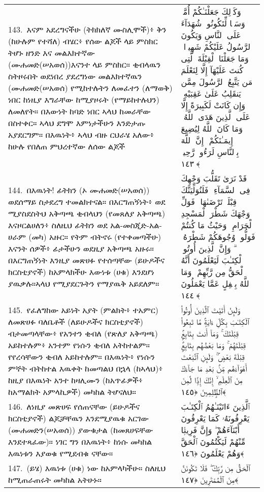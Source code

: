 \documentclass[11pt,a4paper,oneside]{article}%
\newcommand{\mytextarabic}[1]{\textarabic{ #1 \flushright}}
\begin{document}
\begin{longtable}{%
  @{}
    p{}
  @{~~~}
    p{}
    @{}
}
143.\ እናም አደረግናችሁ (ትክክለኛ ሙስሊሞች)፥ ቅን (ከሁሉም የተሻለ) ብሄር፥ የሰው ልጆች ላይ ምስክር ትሆኑ ዘንድ እና መልእክተኛው (ሙሐመድ(ሠአወሰ))እናንተ ላይ ምስክር። ቂብላዉን ስትዞሩበት ወደነበረ ያደረግነው መልእክተኛዉን (ሙሐመድ(ሠአወሰ) የሚከተሉትን ለመፈተን (ለማወቅ) ነበር ከነዚያ እግራቸው ከሚያዞሩት (የማይከተሉህን) ለመለየት። በእውነት ከባድ ነበር ኣላህ ከመራቸው በስተቀር። ኣላህ ደግሞ እምነታችሁን እንድታጡ አያደርግም። በእዉነት፥ ኣላህ ብዙ ርህራሄ አለው፥ ከሁሉ የበለጠ ምህረተኛው ለሰው ልጆች &  \mytextarabic{وَكَذَٟلِكَ جَعَلْنَـٰكُمْ أُمَّةًۭ وَسَطًۭا لِّتَكُونُوا۟ شُهَدَآءَ عَلَى ٱلنَّاسِ وَيَكُونَ ٱلرَّسُولُ عَلَيْكُمْ شَهِيدًۭا ۗ وَمَا جَعَلْنَا ٱلْقِبْلَةَ ٱلَّتِى كُنتَ عَلَيْهَآ إِلَّا لِنَعْلَمَ مَن يَتَّبِعُ ٱلرَّسُولَ مِمَّن يَنقَلِبُ عَلَىٰ عَقِبَيْهِ ۚ وَإِن كَانَتْ لَكَبِيرَةً إِلَّا عَلَى ٱلَّذِينَ هَدَى ٱللَّهُ ۗ وَمَا كَانَ ٱللَّهُ لِيُضِيعَ إِيمَـٰنَكُمْ ۚ إِنَّ ٱللَّهَ بِٱلنَّاسِ لَرَءُوفٌۭ رَّحِيمٌۭ ﴿١٤٣﴾}\\
144.\ በእዉነት! ፊትክን (ኦ ሙሐመድ(ሠአወሰ)) ወደሰማይ ስታደረግ ተመልክተናል። በእርግጠኝነት፥ ወደ ሚያስደስትህ አቅጣጫ ቂብላህን (የመጸለያ አቅጣጫ) እናዞርልሀለን፥ ስለዚህ ፊትክን ወደ አል-መስጂድ-አል-ሀራም (መካ) አዙር። የትም ብትኖሩ (የተቀመጣችሁ) እናንት ሰዎች፥ ፊታችሁን ወደዚያ አቅጣጫ አዙሩ። በእርግጠኝነት እንዚያ መጽሀፉ የተሰጣቸው (ይሁዶችና ክርስቲያኖች) ከአምላክችሁ እውነቱ (ሀቁ) እንደሆነ ያዉቃሉ።ኣላህ የሚያደርጉትን የማያዉቅ አይደለም።  &  \mytextarabic{قَدْ نَرَىٰ تَقَلُّبَ وَجْهِكَ فِى ٱلسَّمَآءِ ۖ فَلَنُوَلِّيَنَّكَ قِبْلَةًۭ تَرْضَىٰهَا ۚ فَوَلِّ وَجْهَكَ شَطْرَ ٱلْمَسْجِدِ ٱلْحَرَامِ ۚ وَحَيْثُ مَا كُنتُمْ فَوَلُّوا۟ وُجُوهَكُمْ شَطْرَهُۥ ۗ وَإِنَّ ٱلَّذِينَ أُوتُوا۟ ٱلْكِتَـٰبَ لَيَعْلَمُونَ أَنَّهُ ٱلْحَقُّ مِن رَّبِّهِمْ ۗ وَمَا ٱللَّهُ بِغَٟفِلٍ عَمَّا يَعْمَلُونَ ﴿١٤٤﴾}\\
145.\ የፈለግከው አይነት አያት (ምልክት፥ ተአምር) ለመጽሀፉ ባለቤቶች (ለይሁዶችና ክርስቲያኖች) ብታመጣላቸው፥ የአንተን ቂብለ (የጽለያ አቅጣጫ) አይከተሉም፥ አንተም የነሱን ቂብለ አትከተልም። የየረሳቸውን ቂብለ አይከተሉም። በእዉነት፥ የነሱን ምኞት ብትከተል እዉቀት ከመጣልህ በኋላ (ከኣላህ)፥ ከዚያ በእዉነት አንተ ከዛሊሙን (ከአጥፊዎች፥ ከአማልክት አምላኪዎች) መካከል ትሆናለህ። &  \mytextarabic{وَلَىِٕنْ أَتَيْتَ ٱلَّذِينَ أُوتُوا۟ ٱلْكِتَـٰبَ بِكُلِّ ءَايَةٍۢ مَّا تَبِعُوا۟ قِبْلَتَكَ ۚ وَمَآ أَنتَ بِتَابِعٍۢ قِبْلَتَهُمْ ۚ وَمَا بَعْضُهُم بِتَابِعٍۢ قِبْلَةَ بَعْضٍۢ ۚ وَلَىِٕنِ ٱتَّبَعْتَ أَهْوَآءَهُم مِّنۢ بَعْدِ مَا جَآءَكَ مِنَ ٱلْعِلْمِ ۙ إِنَّكَ إِذًۭا لَّمِنَ ٱلظَّٟلِمِينَ ﴿١٤٥﴾}\\
146.\ ለነዚያ መጽሀፍ የሰጠናቸው (ይሁዶችና ክርስቲያኖች) ልጆቻቸዉን እንደሚያዉቁ አርገው (ሙሐመድን(ሠአወሰ)) ያውቁታል (ከመጸሀፍቸው እንደተጻፈው)። ነገር ግን በእዉነት፥ ከነሱ መካከል እዉነቱን እያወቁ የሚደብቁ ናቸው። &  \mytextarabic{ٱلَّذِينَ ءَاتَيْنَـٰهُمُ ٱلْكِتَـٰبَ يَعْرِفُونَهُۥ كَمَا يَعْرِفُونَ أَبْنَآءَهُمْ ۖ وَإِنَّ فَرِيقًۭا مِّنْهُمْ لَيَكْتُمُونَ ٱلْحَقَّ وَهُمْ يَعْلَمُونَ ﴿١٤٦﴾}\\
147.\ (ይሄ) እዉነቱ (ሀቁ) ነው ከአምላካችሁ። ስለዚህ ከሚጠራጠሩት መካከል አትሁኑ። &  \mytextarabic{ ٱلْحَقُّ مِن رَّبِّكَ ۖ فَلَا تَكُونَنَّ مِنَ ٱلْمُمْتَرِينَ ﴿١٤٧﴾}\\

\end{longtable}
\end{document}
